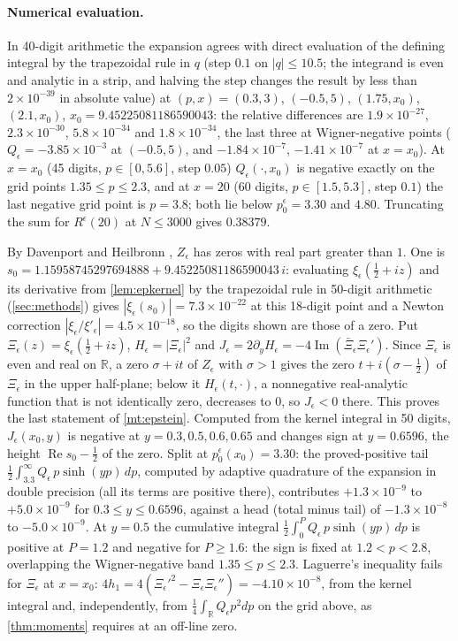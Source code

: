 \documentclass[11pt]{article}
\theoremstyle{definition}\newtheorem{definition}[theorem]{Definition}
\theoremstyle{remark}\newtheorem{remark}[theorem]{Remark}
\newcommand{\R}{\mathbb R}\newcommand{\C}{\mathbb C}\newcommand{\N}{\mathbb N}
\renewcommand{\Re}{\operatorname{Re}}\renewcommand{\Im}{\operatorname{Im}}
\begin{document}
\paragraph{Numerical evaluation.} In 40-digit arithmetic the expansion agrees with direct evaluation of the defining integral by the trapezoidal rule in $q$ (step $0.1$ on $|q|\le10.5$; the integrand is even and analytic in a strip, and halving the step changes the result by less than $2\times10^{-39}$ in absolute value) at $(p,x)=(0.3,3)$, $(-0.5,5)$, $(1.75,x_0)$, $(2.1,x_0)$, $x_0=9.45225081186590043$: the relative differences are $1.9\times10^{-27}$, $2.3\times10^{-30}$, $5.8\times10^{-34}$ and $1.8\times10^{-34}$, the last three at Wigner-negative points ($Q_\epsilon=-3.85\times10^{-3}$ at $(-0.5,5)$, and $-1.84\times10^{-7}$, $-1.41\times10^{-7}$ at $x=x_0$). At $x=x_0$ (45 digits, $p\in[0,5.6]$, step $0.05$) $Q_\epsilon(\cdot,x_0)$ is negative exactly on the grid points $1.35\le p\le2.3$, and at $x=20$ (60 digits, $p\in[1.5,5.3]$, step $0.1$) the last negative grid point is $p=3.8$; both lie below $p_0^\epsilon=3.30$ and $4.80$. Truncating the sum for $R^\epsilon(20)$ at $N\le3000$ gives $0.38379$.

By Davenport and Heilbronn \cite{DH}, $Z_\epsilon$ has zeros with real part greater than $1$. One is $s_0=1.15958745297694888+9.45225081186590043\,i$: evaluating $\xi_\epsilon(\frac12+iz)$ and its derivative from \cref{lem:epkernel} by the trapezoidal rule in 50-digit arithmetic (\cref{sec:methods}) gives $|\xi_\epsilon(s_0)|=7.3\times10^{-22}$ at this 18-digit point and a Newton correction $|\xi_\epsilon/\xi'_\epsilon|=4.5\times10^{-18}$, so the digits shown are those of a zero. Put $\Xi_\epsilon(z)=\xi_\epsilon(\frac12+iz)$, $H_\epsilon=|\Xi_\epsilon|^2$ and $J_\epsilon=2\partial_yH_\epsilon=-4\Im(\bar\Xi_\epsilon\Xi_\epsilon')$. Since $\Xi_\epsilon$ is even and real on $\R$, a zero $\sigma+it$ of $Z_\epsilon$ with $\sigma>1$ gives the zero $t+i(\sigma-\frac12)$ of $\Xi_\epsilon$ in the upper half-plane; below it $H_\epsilon(t,\cdot)$, a nonnegative real-analytic function that is not identically zero, decreases to $0$, so $J_\epsilon<0$ there. This proves the last statement of \cref{mt:epstein}. Computed from the kernel integral in 50 digits, $J_\epsilon(x_0,y)$ is negative at $y=0.3,0.5,0.6,0.65$ and changes sign at $y=0.6596$, the height $\Re s_0-\frac12$ of the zero. Split at $p_0^\epsilon(x_0)=3.30$: the proved-positive tail $\frac12\int_{3.3}^\infty Q_\epsilon\,p\sinh(yp)\,dp$, computed by adaptive quadrature of the expansion in double precision (all its terms are positive there), contributes $+1.3\times10^{-9}$ to $+5.0\times10^{-9}$ for $0.3\le y\le0.6596$, against a head (total minus tail) of $-1.3\times10^{-8}$ to $-5.0\times10^{-9}$. At $y=0.5$ the cumulative integral $\frac12\int_0^PQ_\epsilon\,p\sinh(yp)\,dp$ is positive at $P=1.2$ and negative for $P\ge1.6$: the sign is fixed at $1.2<p<2.8$, overlapping the Wigner-negative band $1.35\le p\le2.3$. Laguerre's inequality fails for $\Xi_\epsilon$ at $x=x_0$: $4h_1=4(\Xi_\epsilon'^2-\Xi_\epsilon\Xi_\epsilon'')=-4.10\times10^{-8}$, from the kernel integral and, independently, from $\frac14\int_\R Q_\epsilon p^2dp$ on the grid above, as \cref{thm:moments} requires at an off-line zero.
\end{document}
